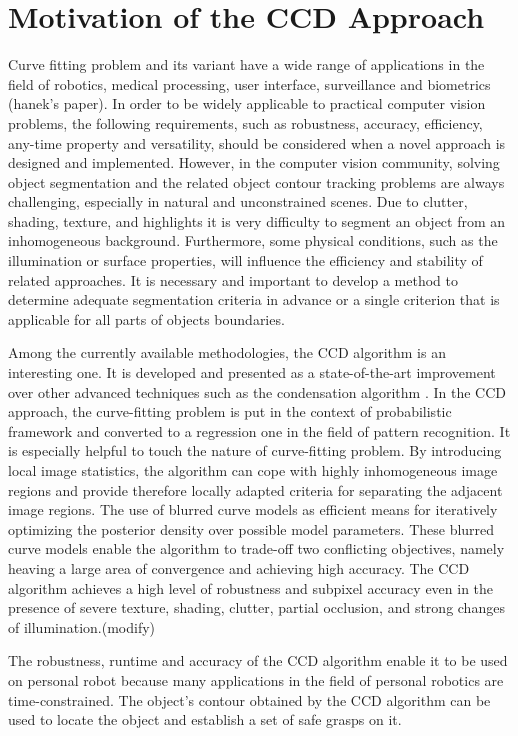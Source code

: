 \section{Motivation of the CCD Approach}
\label{sec:mccd}
Curve fitting problem and its variant have a wide range of
applications in the field of robotics, medical processing, user
interface, surveillance and biometrics (hanek's paper). In order to be
widely applicable to practical computer vision problems, the following
requirements, such as robustness,
accuracy, efficiency, any-time property and versatility, should be
considered when a novel approach is designed and implemented.
However, in the computer vision community, solving object segmentation and the
related object contour tracking problems are always challenging,
especially in natural and unconstrained scenes. Due to clutter,
shading, texture, and highlights it is very difficulty to segment
an object from an inhomogeneous background. Furthermore, some physical
conditions, such as the illumination or surface properties, will
influence the efficiency and stability of related approaches. It is
necessary and important to develop a method to determine adequate segmentation
criteria in advance or a single criterion that is applicable
for all parts of objects boundaries.

Among the currently available methodologies, the CCD algorithm is an
interesting one. It is developed and presented as a state-of-the-art
improvement over other advanced techniques such as the condensation
algorithm \cite{panin2006fully}. In the CCD approach, the curve-fitting problem is
put in the context of probabilistic framework and converted to a
regression one in the field of pattern recognition. It is especially
helpful to touch the nature of curve-fitting problem. By introducing
local image statistics, the algorithm can cope with highly
inhomogeneous image regions and provide therefore locally adapted
criteria for separating the adjacent image regions. The use of blurred
curve models as efficient means for iteratively optimizing the
posterior density over possible model parameters. These blurred curve
models enable the algorithm to trade-off two conflicting objectives,
namely heaving a large area of convergence and achieving high
accuracy. The CCD algorithm achieves a high level of robustness and subpixel
accuracy even in the presence of severe texture, shading, clutter,
partial occlusion, and strong changes of illumination.(modify)

The robustness, runtime and accuracy of the CCD algorithm enable it 
to be used on personal robot  because many applications in the field
of personal robotics are time-constrained. The object's contour
obtained by the CCD algorithm can be used to locate the object and
establish a set of safe grasps on it\cite{hanek2000vision}.




